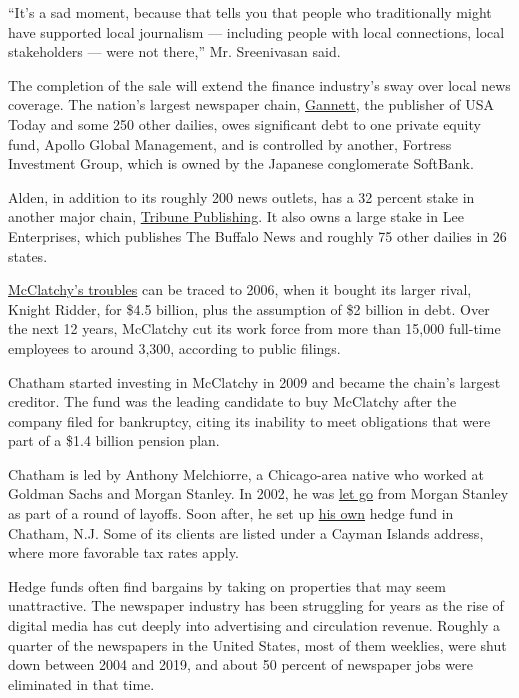 ``It's a sad moment, because that tells you that people who
traditionally might have supported local journalism --- including people
with local connections, local stakeholders --- were not there,'' Mr.
Sreenivasan said.

The completion of the sale will extend the finance industry's sway over
local news coverage. The nation's largest newspaper chain,
\href{https://www.nytimes3xbfgragh.onion/2019/11/19/business/media/gannett-gatehouse-merger.html}{Gannett},
the publisher of USA Today and some 250 other dailies, owes significant
debt to one private equity fund, Apollo Global Management, and is
controlled by another, Fortress Investment Group, which is owned by the
Japanese conglomerate SoftBank.

Alden, in addition to its roughly 200 news outlets, has a 32 percent
stake in another major chain,
\href{https://www.nytimes3xbfgragh.onion/2020/07/02/business/media/tribune-alden-board-seat.html}{Tribune
Publishing}. It also owns a large stake in Lee Enterprises, which
publishes The Buffalo News and roughly 75 other dailies in 26 states.

\href{https://www.nytimes3xbfgragh.onion/2006/03/13/business/media/newspaper-chain-agrees-to-a-sale-for-45-billion.html}{McClatchy's
troubles} can be traced to 2006, when it bought its larger rival, Knight
Ridder, for \$4.5 billion, plus the assumption of \$2 billion in debt.
Over the next 12 years, McClatchy cut its work force from more than
15,000 full-time employees to around 3,300, according to public filings.

Chatham started investing in McClatchy in 2009 and became the chain's
largest creditor. The fund was the leading candidate to buy McClatchy
after the company filed for bankruptcy, citing its inability to meet
obligations that were part of a \$1.4 billion pension plan.

Chatham is led by Anthony Melchiorre, a Chicago-area native who worked
at Goldman Sachs and Morgan Stanley. In 2002, he was
\href{https://www.fnlondon.com/articles/morgan-stanley-cuts-leveraged-finance-as-bank-cull-hits-2500-20021121}{let
go} from Morgan Stanley as part of a round of layoffs. Soon after, he
set up
\href{https://www.sec.gov/Archives/edgar/data/915802/000091580217000002/redmontprochathamsupplement0.htm}{his
own} hedge fund in Chatham, N.J. Some of its clients are listed under a
Cayman Islands address, where more favorable tax rates apply.

Hedge funds often find bargains by taking on properties that may seem
unattractive. The newspaper industry has been struggling for years as
the rise of digital media has cut deeply into advertising and
circulation revenue. Roughly a quarter of the newspapers in the United
States, most of them weeklies, were shut down between 2004 and 2019, and
about 50 percent of newspaper jobs were eliminated in that time.

